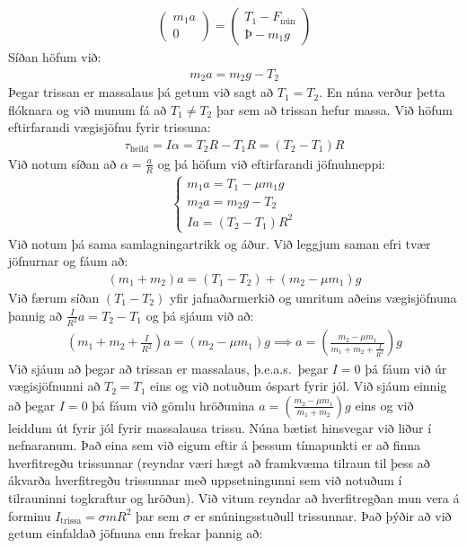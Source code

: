 \ifdefined \wholebook \else\documentclass[oneside]{book}\usepackage{EdlBook}\graphicspath{{figures/}}
\begin{document}
\begin{align*}
    \begin{pmatrix} m_1 a \\ 0 \end{pmatrix} = \begin{pmatrix}  T_1 - F_{\text{nún}} \\ Þ - m_1g \end{pmatrix}
\end{align*}
Síðan höfum við:
\begin{align*}
   m_2 a = m_2g - T_2
\end{align*}
Þegar trissan er massalaus þá getum við sagt að $T_1 = T_2$. En núna verður þetta flóknara og við munum fá að $T_1 \neq T_2$ þar sem að trissan hefur massa. Við höfum eftirfarandi vægisjöfnu fyrir trissuna:
\begin{align*}
    \tau_{\text{heild}} = I\alpha = T_2 R - T_1 R = (T_2-T_1)R
\end{align*}
Við notum síðan að $\alpha = \frac{a}{R}$ og þá höfum við eftirfarandi jöfnuhneppi:
\begin{align*}
    \begin{cases}
    m_1a = T_1 - \mu m_1 g \\
    m_2a = m_2g - T_2 \\
    Ia = (T_2 - T_1)R^2
    \end{cases}
\end{align*}
Við notum þá sama samlagningartrikk og áður. Við leggjum saman efri tvær jöfnurnar og fáum að:
\begin{align*}
    \left(m_1 + m_2\right)a = (T_1 - T_2) + \left( m_2 - \mu m_1\right)g
\end{align*}
Við færum síðan $(T_1 - T_2)$ yfir jafnaðarmerkið og umritum aðeins vægisjöfnuna þannig að $\frac{I}{R^2}a = T_2 - T_1$ og þá sjáum við að:
\begin{align*}
    \left(m_1 + m_2 + \frac{I}{R^2}\right)a = \left(m_2 - \mu m_1 \right)g \implies a = \left(\frac{m_2 - \mu m_1}{m_1 + m_2 + \frac{I}{R^2}} \right)g
\end{align*}
Við sjáum að þegar að trissan er massalaus, þ.e.a.s.~þegar $I = 0$ þá fáum við úr vægisjöfnunni að $T_2 = T_1$ eins og við notuðum óspart fyrir jól. Við sjáum einnig að þegar $I = 0$ þá fáum við gömlu hröðunina $a = \left(\frac{m_2 - \mu m_1}{m_1 + m_2}\right)g$ eins og við leiddum út fyrir jól fyrir massalausa trissu. Núna bætist hinsvegar við liður í nefnaranum. Það eina sem við eigum eftir á þessum tímapunkti er að finna hverfitregðu trissunnar (reyndar væri hægt að framkvæma tilraun til þess að ákvarða hverfitregðu trissunnar með uppsetningunni sem við notuðum í tilrauninni togkraftur og hröðun). Við vitum reyndar að hverfitregðan mun vera á forminu $I_{\text{trissa}} = \sigma mR^2$ þar sem $\sigma$ er snúningsstuðull trissunnar. Það þýðir að við getum einfaldað jöfnuna enn frekar þannig að:
\end{document}
